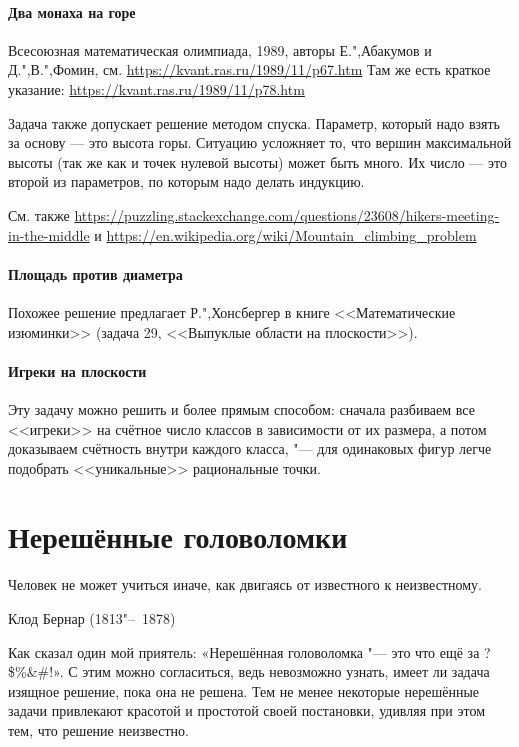 \documentclass[twoside]{book}
\begin{document}
\subsubsection{Два монаха на горе}
Всесоюзная математическая олимпиада, 1989, авторы Е.",Абакумов и Д.",В.",Фомин, 
см. \url{https://kvant.ras.ru/1989/11/p67.htm}
Там же есть краткое указание:  \url{https://kvant.ras.ru/1989/11/p78.htm} 

Задача также допускает решение методом спуска. Параметр, который надо взять за основу --- это высота горы. Ситуацию усложняет то, что вершин максимальной высоты (так же как и точек нулевой высоты) может быть много. Их число --- это второй из параметров, по которым надо делать индукцию.

См. также \url{https://puzzling.stackexchange.com/questions/23608/hikers-meeting-in-the-middle}
и \url{https://en.wikipedia.org/wiki/Mountain_climbing_problem}


\subsubsection{Площадь против диаметра}
Похожее решение предлагает Р.",Хонсбергер  в книге <<Математические изюминки>> 
(задача 29, <<Выпуклые области на плоскости>>). 

\subsubsection{Игреки на плоскости}
Эту задачу можно решить и более прямым способом: сначала разбиваем все <<игреки>> на счётное число классов в зависимости от их размера, 
а потом доказываем счётность внутри каждого класса, "--- для одинаковых фигур легче подобрать <<уникальные>> рациональные точки.



\chapter{Нерешённые головоломки}

\setlength{\epigraphwidth}{.55\textwidth}
\epigraph{Человек не может учиться иначе, как двигаясь от известного к неизвестному.\vspace{1ex}}{Клод Бернар (1813"--~1878)}

Как сказал один мой приятель: «Нерешённая головоломка "--- это что ещё за ?\$\%\&\#\@!».
С этим можно согласиться, ведь невозможно узнать, имеет ли задача изящное решение, пока она не решена.
Тем не менее некоторые нерешённые задачи привлекают красотой и простотой своей постановки, удивляя при этом тем, что решение неизвестно.
\end{document}
